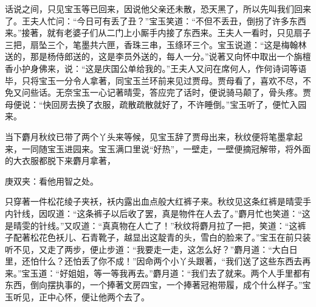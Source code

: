 \begin{parag}
    话说之间，只见宝玉等已回来，因说他父亲还未散，恐天黑了，所以先叫我们回来了。王夫人忙问：“今日可有丢了丑？”宝玉笑道：“不但不丢丑，倒拐了许多东西来。”接著，就有老婆子们从二门上小厮手内接了东西来。王夫人一看时，只见扇子三把，扇坠三个，笔墨共六匣，香珠三串，玉绦环三个。宝玉说道：“这是梅翰林送的，那是杨侍郎送的，这是李员外送的，每人一分。”说著又向怀中取出一个旃檀香小护身佛来，说：“这是庆国公单给我的。”王夫人又问在席何人，作何诗词等语毕，只将宝玉一分令人拿著，同宝玉兰环前来见过贾母。贾母看了，喜欢不尽，不免又问些话。无奈宝玉一心记著晴雯，答应完了话时，便说骑马颠了，骨头疼。贾母便说：“快回房去换了衣服，疏散疏散就好了，不许睡倒。”宝玉听了，便忙入园来。
\end{parag}


\begin{parag}
    当下麝月秋纹已带了两个丫头来等候，见宝玉辞了贾母出来，秋纹便将笔墨拿起来，一同随宝玉进园来。宝玉满口里说“好热”，一壁走，一壁便摘冠解带，将外面的大衣服都脱下来麝月拿著，\begin{note}庚双夹：看他用智之处。\end{note}只穿著一件松花绫子夹袄，袄内露出血点般大红裤子来。秋纹见这条红裤是晴雯手内针线，因叹道：“这条裤子以后收了罢，真是物件在人去了。”麝月忙也笑道：“这是晴雯的针线。”又叹道：“真真物在人亡了！”秋纹将麝月拉了一把，笑道：“这裤子配著松花色袄儿、石青靴子，越显出这靛青的头，雪白的脸来了。”宝玉在前只装听不见，又走了两步，便止步道：“我要走一走，这怎么好？”麝月道：“大白日里，还怕什么？还怕丢了你不成！”因命两个小丫头跟著，“我们送了这些东西去再来。”宝玉道：“好姐姐，等一等我再去。”麝月道：“我们去了就来。两个人手里都有东西，倒向摆执事的，一个捧著文房四宝，一个捧著冠袍带履，成个什么样子。”宝玉听见，正中心怀，便让他两个去了。
\end{parag}


